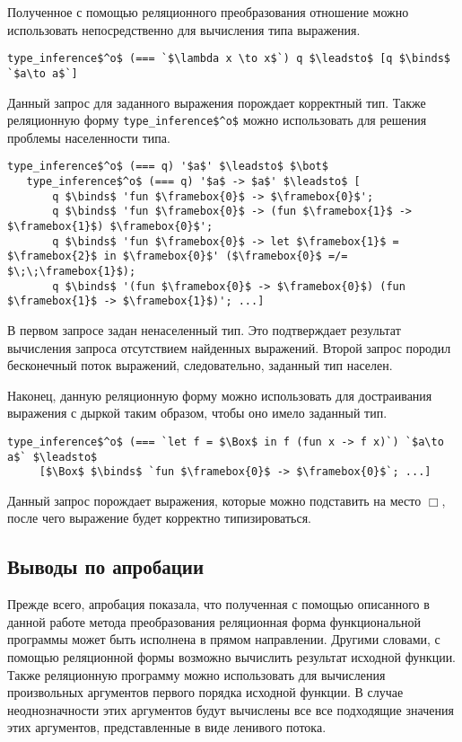 Полученное с помощью реляционного преобразования отношение можно использовать непосредственно для вычисления типа выражения.

\begin{lstlisting}[basicstyle=\small]
   type_inference$^o$ (=== `$\lambda x \to x$`) q $\leadsto$ [q $\binds$ `$a\to a$`]
\end{lstlisting}

Данный запрос для заданного выражения порождает корректный тип. Также реляционную форму \lstinline|type_inference$^o$| можно использовать для решения проблемы населенности типа.

\begin{lstlisting}[basicstyle=\small]
   type_inference$^o$ (=== q) '$a$' $\leadsto$ $\bot$
   type_inference$^o$ (=== q) '$a$ -> $a$' $\leadsto$ [
       q $\binds$ 'fun $\framebox{0}$ -> $\framebox{0}$';
       q $\binds$ 'fun $\framebox{0}$ -> (fun $\framebox{1}$ -> $\framebox{1}$) $\framebox{0}$';
       q $\binds$ 'fun $\framebox{0}$ -> let $\framebox{1}$ = $\framebox{2}$ in $\framebox{0}$' ($\framebox{0}$ =/= $\;\;\framebox{1}$);
       q $\binds$ '(fun $\framebox{0}$ -> $\framebox{0}$) (fun $\framebox{1}$ -> $\framebox{1}$)'; ...]
\end{lstlisting}

В первом запросе задан ненаселенный тип. Это подтверждает результат
вычисления запроса отсутствием найденных выражений. Второй запрос
породил бесконечный поток выражений, следовательно, заданный тип
населен.

Наконец, данную реляционную форму можно использовать для достраивания
выражения с дыркой таким образом, чтобы оно имело заданный тип.

\begin{lstlisting}[basicstyle=\small]
   type_inference$^o$ (=== `let f = $\Box$ in f (fun x -> f x)`) `$a\to a$` $\leadsto$
     [$\Box$ $\binds$ `fun $\framebox{0}$ -> $\framebox{0}$`; ...]
\end{lstlisting}

Данный запрос порождает выражения, которые можно подставить на место $\Box$,
после чего выражение будет корректно типизироваться.

\subsection{Выводы по апробации}

Прежде всего, апробация показала, что полученная с помощью описанного в данной работе метода преобразования реляционная форма функциональной программы может быть исполнена в прямом направлении. Другими словами, с помощью реляционной формы возможно вычислить результат исходной функции. Также реляционную программу можно использовать для вычисления произвольных аргументов первого порядка исходной функции. В случае неоднозначности этих аргументов будут вычислены все все подходящие значения этих аргументов, представленные в виде ленивого потока.

